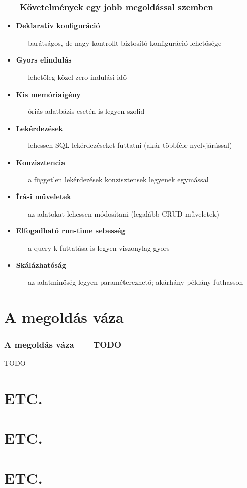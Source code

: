 \documentclass{beamer}
\newcommand{\condpause}{\pause}
\newcommand{\slidetitle}[2]{\frametitle{{\small #1 ~ \ding{226} ~ } #2}}
\begin{document}
\begin{frame}
	\slidetitle{\sectiontitle}{Követelmények egy jobb megoldással szemben}
	
	\begin{itemize}
		\item \textbf{Deklaratív konfiguráció} \par ~ ~ {\small barátságos, de nagy kontrollt biztosító konfiguráció lehetősége} \condpause
		\item \textbf{Gyors elindulás} \par ~ ~ {\small lehetőleg közel zero indulási idő} \condpause
		\item \textbf{Kis memóriaigény} \par ~ ~ {\small óriás adatbázis esetén is legyen szolid} \condpause
		\item \textbf{Lekérdezések} \par ~ ~ {\small lehessen SQL lekérdezéseket futtatni (akár többféle nyelvjárással)} \condpause
		\item \textbf{Konzisztencia} \par ~ ~ {\small a független lekérdezések konzisztensek legyenek egymással} \condpause
		\item \textbf{Írási műveletek} \par ~ ~ {\small az adatokat lehessen módosítani (legalább CRUD műveletek)} \condpause
		\item \textbf{Elfogadható run-time sebesség} \par ~ ~ {\small a query-k futtatása is legyen viszonylag gyors} \condpause
		\item \textbf{Skálázhatóság} \par ~ ~ {\small az adatminőség legyen paraméterezhető; akárhány példány futhasson}
	\end{itemize}
	
\end{frame}


\def\sectiontitle{A megoldás váza}
\section{\sectiontitle}


\begin{frame}
	\slidetitle{\sectiontitle}{TODO}
	TODO
\end{frame}


\section{ETC.}
\section{ETC.}
\section{ETC.}
\end{document}
